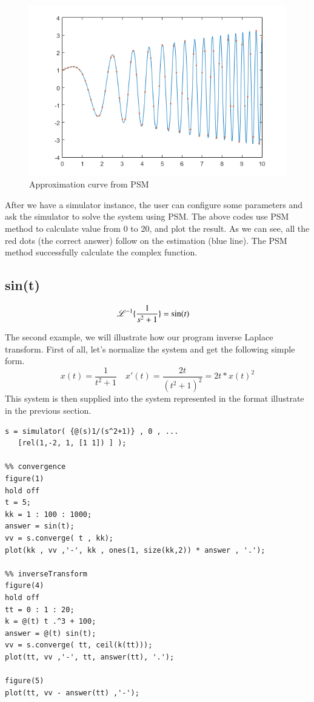 \documentclass[12pt]{article}
\begin{document}
\begin{figure}
\caption{Approximation curve from PSM}
\includegraphics[scale=1]{nastyProb.png}
\end{figure}

After we have a simulator instance, the user can configure some parameters and ask the simulator to solve the system using PSM. The above codes use PSM method to calculate value from 0 to 20, and plot the result. As we can see, all the red dots (the correct answer) follow on the estimation (blue line). The PSM method successfully calculate the complex function.

\clearpage
\subsection{sin(t)}

\begin{equation}
\mathscr{L}^{-1}\{\frac{1}{s^2 + 1}\} = \sin(t) \quad\scriptscriptstyle
\end{equation}

The second example, we will illustrate how our program inverse Laplace transform. First of all, let's normalize the system and get the following simple form.
\begin{equation}
x(t) = \frac{1}{t^2 + 1} \quad x'(t) = \frac{2t}{(t^2 + 1)^2} = 2t *x(t)^2
\end{equation}
This system is then supplied into the system represented in the format illustrate in the previous section.
\begin{lstlisting}
s = simulator( {@(s)1/(s^2+1)} , 0 , ...
   [rel(1,-2, 1, [1 1]) ] );
   
%% convergence
figure(1)
hold off
t = 5;
kk = 1 : 100 : 1000;
answer = sin(t);
vv = s.converge( t , kk);
plot(kk , vv ,'-', kk , ones(1, size(kk,2)) * answer , '.');

%% inverseTransform
figure(4)
hold off
tt = 0 : 1 : 20;
k = @(t) t .^3 + 100;
answer = @(t) sin(t);
vv = s.converge( tt, ceil(k(tt)));
plot(tt, vv ,'-', tt, answer(tt), '.');

figure(5)
plot(tt, vv - answer(tt) ,'-');
\end{lstlisting}
\end{document}
